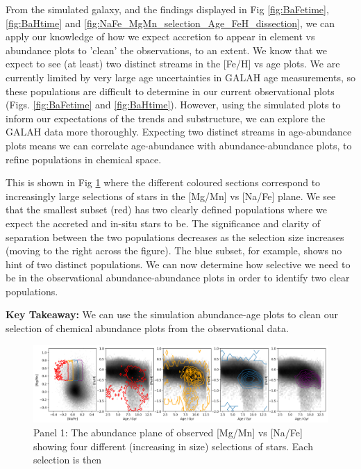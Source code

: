 \documentclass[fleqn,usenatbib]{mnras}
\begin{document}
From the simulated galaxy, and the findings displayed in Fig \ref{fig:BaFetime}, \ref{fig:BaHtime} and \ref{fig:NaFe_MgMn_selection_Age_FeH_dissection}, we can apply our knowledge of how we expect accretion to appear in element vs abundance plots to 'clean' the observations, to an extent. We know that we expect to see (at least) two distinct streams in the [Fe/H] vs age plots. We are currently limited by very large age uncertainties in GALAH age measurements, so these populations are difficult to determine in our current observational plots (Figs. \ref{fig:BaFetime} and \ref{fig:BaHtime}). However, using the simulated plots to inform our expectations of the trends and substructure, we can explore the GALAH data more thoroughly. Expecting two distinct streams in age-abundance plots means we can correlate age-abundance  with abundance-abundance plots, to refine populations in chemical space. \par 
This is shown in Fig \ref{fig:NaFe_MgMn_selection_Age_FeH} where the different coloured sections correspond to increasingly large selections of stars in the [Mg/Mn] vs [Na/Fe] plane. We see that the smallest subset (red) has two clearly defined populations where we expect the accreted and in-situ stars to be. The significance and clarity of separation between the two populations decreases as the selection size increases (moving to the right across the figure). The blue subset, for example, shows no hint of two distinct populations. We can now determine how selective we need to be in the observational abundance-abundance plots in order to identify two clear populations. \par 
\textbf{Key Takeaway:} We can use the simulation abundance-age plots to clean our selection of chemical abundance plots from the observational data. 


\begin{figure}
	\includegraphics[width=\textwidth]{figures/NaFe_MgMn_selection_Age_FeH.png}
    \caption{Panel 1: The abundance plane of observed [Mg/Mn] vs [Na/Fe] showing four different (increasing in size) selections of stars. Each selection is then }
    \label{fig:NaFe_MgMn_selection_Age_FeH}
\end{figure}
\end{document}

